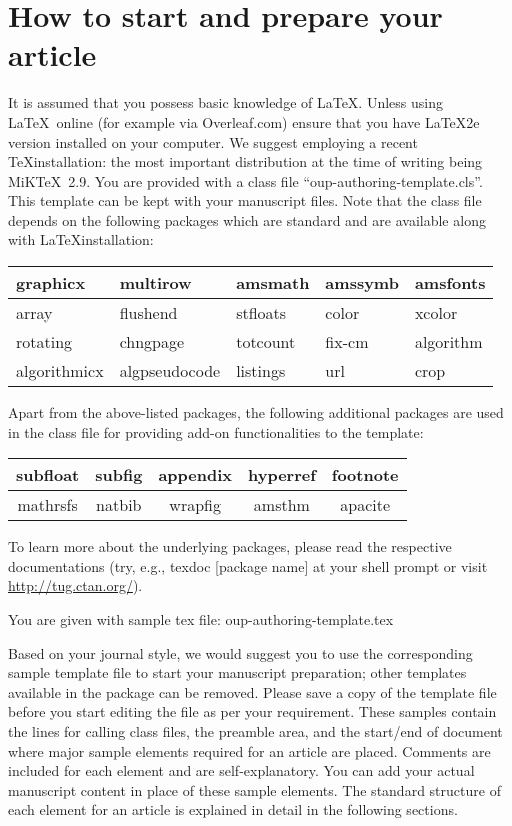 \documentclass{article}
\begin{document}
\section{How to start and prepare your article  }
It is assumed that you possess basic knowledge of  \LaTeX. Unless using \LaTeX\ online (for example via Overleaf.com) ensure that you have \LaTeX2e version installed on your computer.  We suggest employing a recent \TeX installation: the most important distribution at the time of writing being MiK\TeX\ 2.9. You are provided with a class file ``oup-authoring-template.cls''. This template can be kept with your manuscript files. Note that the class file depends on the following packages which are standard and are available along with \LaTeX installation:

\begin{center}\begin{tabular}{|l|l|l|l|l|}\hline
graphicx & multirow & amsmath & amssymb & amsfonts \\\hline
array & flushend & stfloats & color & xcolor \\\hline
rotating & chngpage & totcount & fix-cm & algorithm \\\hline
algorithmicx & algpseudocode & listings & url & crop \\\hline
\end{tabular}\end{center}

Apart from the above-listed packages, the following additional packages are used in the class file for providing add-on functionalities to the template:

\begin{center}\begin{tabular}{|c|c|c|c|c|}\hline
subfloat & subfig & appendix & hyperref & footnote \\\hline
mathrsfs & natbib & wrapfig & amsthm & apacite \\\hline
\end{tabular}\end{center}

To learn more about the underlying packages, please read the respective documentations (try, e.g., texdoc [package name] at your shell prompt or visit \url{http://tug.ctan.org/}).

\medskip

\noindent You are given with sample tex file: oup-authoring-template.tex

\medskip

Based on your journal style, we would suggest you to use the corresponding sample template file to start your manuscript preparation; other templates available in the package can be removed. Please save a copy of the template file before you start editing the file as per your requirement. These samples contain the lines for calling class files, the preamble area, and the start/end of document where major sample elements required for an article are placed. Comments are included for each element and are self-explanatory. You can add your actual manuscript content in place of these sample elements. The standard structure of each element for an article is explained in detail in the following sections.
\end{document}
